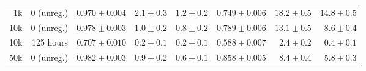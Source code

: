\begin{table}[ht]
{\begin{tabular}{rr|rrr|rrr}
1k & 0 (unreg.) & \cellcolor{green!49} $0.970 \pm 0.004$ & \cellcolor{red!6} $2.1 \pm 0.3$ & \cellcolor{red!6} $1.2 \pm 0.2$ & \cellcolor{green!33} $0.749 \pm 0.006$ & \cellcolor{red!23} $18.2 \pm 0.5$ & \cellcolor{red!19} $14.8 \pm 0.5$ \\
10k & 0 (unreg.) & \cellcolor{green!49} $0.978 \pm 0.003$ & \cellcolor{red!5} $1.0 \pm 0.2$ & \cellcolor{red!5} $0.8 \pm 0.2$ & \cellcolor{green!36} $0.789 \pm 0.006$ & \cellcolor{red!18} $13.1 \pm 0.5$ & \cellcolor{red!13} $8.6 \pm 0.4$ \\
10k & 125 hours & \cellcolor{green!30} $0.707 \pm 0.010$ & \cellcolor{red!5} $\bm{0.2 \pm 0.1}$ & \cellcolor{red!5} $\bm{0.2 \pm 0.1}$ & \cellcolor{green!21} $0.588 \pm 0.007$ & \cellcolor{red!7} $\bm{2.4 \pm 0.2}$ & \cellcolor{red!5} $\bm{0.4 \pm 0.1}$ \\
50k & 0 (unreg.) & \cellcolor{green!50} $\bm{0.982 \pm 0.003}$ & \cellcolor{red!5} $0.9 \pm 0.2$ & \cellcolor{red!5} $0.6 \pm 0.1$ & \cellcolor{green!41} $\bm{0.858 \pm 0.005}$ & \cellcolor{red!13} $8.4 \pm 0.4$ & \cellcolor{red!10} $5.8 \pm 0.3$ \\
\bottomrule
\end{tabular}}
\end{table}
